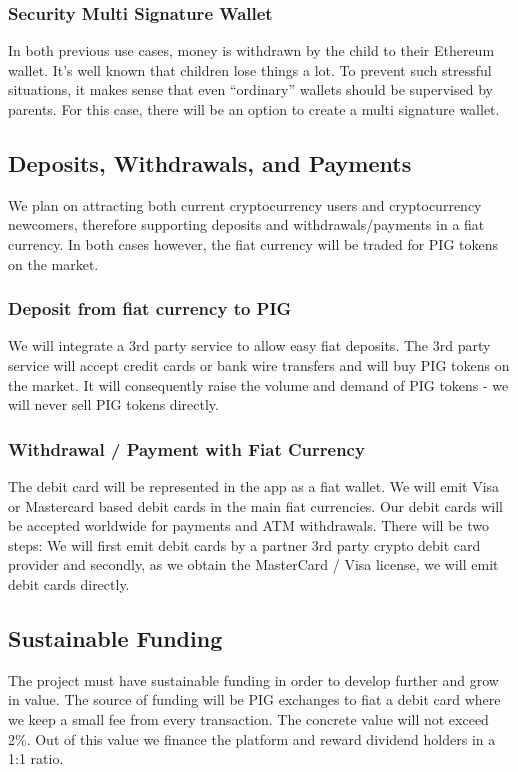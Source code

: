 \documentclass[english]{article}
\begin{document}
\subsubsection{Security Multi Signature Wallet}
In both previous use cases, money is withdrawn by the child to their Ethereum wallet. It’s well known that children lose things a lot. To prevent such stressful situations, it makes sense that even “ordinary” wallets should be supervised by parents. For this case, there will be an option to create a multi signature wallet. 

\subsection{Deposits, Withdrawals, and Payments}
We plan on attracting both current cryptocurrency users and cryptocurrency newcomers, therefore supporting deposits and withdrawals/payments in a fiat currency. In both cases however, the fiat currency will be traded for PIG tokens on the market.

\subsubsection{Deposit from fiat currency to PIG}
We will integrate a 3rd party service to allow easy fiat deposits. The 3rd party service will accept credit cards or bank wire transfers and will buy PIG tokens on the market. It will consequently raise the volume and demand of PIG tokens - we will never sell PIG tokens directly.

\subsubsection{Withdrawal / Payment with Fiat Currency}
The debit card will be represented in the app as a fiat wallet. We will emit Visa or Mastercard based debit cards in the main fiat currencies. Our debit cards will be accepted worldwide for payments and ATM withdrawals. There will be two steps: We will first emit debit cards by a partner 3rd party crypto debit card provider and secondly, as we obtain the MasterCard / Visa license, we will emit debit cards directly.

\subsection{Sustainable Funding}
The project must have sustainable funding in order to develop further and grow in value. The source of funding will be PIG exchanges to fiat a debit card where we keep a small fee from every transaction. The concrete value will not exceed 2\%. Out of this value we finance the platform and reward dividend holders in a 1:1 ratio.
\end{document}
